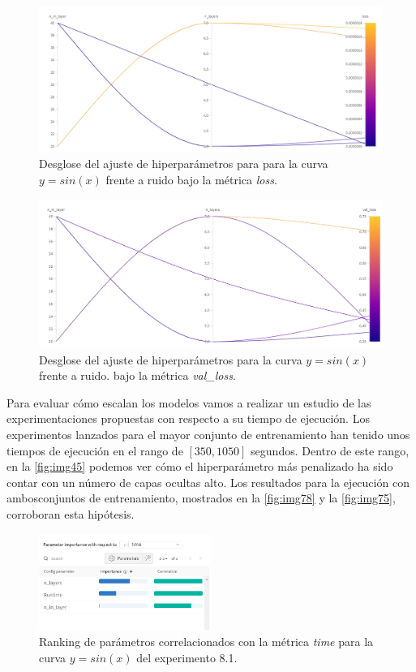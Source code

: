 \begin{figure}[htbp]
    \centering
    \includegraphics[width=1\textwidth]{img/img71.png}
    \caption{Desglose del ajuste de hiperparámetros para para la curva $y=sin(x)$ frente a ruido bajo la métrica \textit{loss}.}
    \label{fig:img71}
\end{figure}

\begin{figure}[htbp]
    \centering
    \includegraphics[width=1\textwidth]{img/img70.png}
    \caption{Desglose del ajuste de hiperparámetros para la curva $y=sin(x)$ frente a ruido. bajo la métrica \textit{val\_loss}.} 
    \label{fig:img70}
\end{figure}

Para evaluar cómo escalan los modelos vamos a realizar un estudio de las experimentaciones propuestas con respecto a su tiempo de ejecución. Los experimentos lanzados para el mayor conjunto de entrenamiento han tenido unos tiempos de ejecución en el rango de $[350,1050]$ segundos. Dentro de este rango, en la \autoref{fig:img45} podemos ver cómo el hiperparámetro más penalizado ha sido contar con un número de capas ocultas alto. Los resultados para la ejecución con ambosconjuntos de entrenamiento, mostrados en la \autoref{fig:img78} y la \autoref{fig:img75}, corroboran esta hipótesis. 

\begin{figure}[htbp]
    \centering
    \includegraphics[width=0.5\textwidth]{img/img45.png}
    \caption{Ranking de parámetros correlacionados con la métrica \textit{time} para la curva $y=sin(x)$ del experimento 8.1.}
    \label{fig:img45}
\end{figure}


